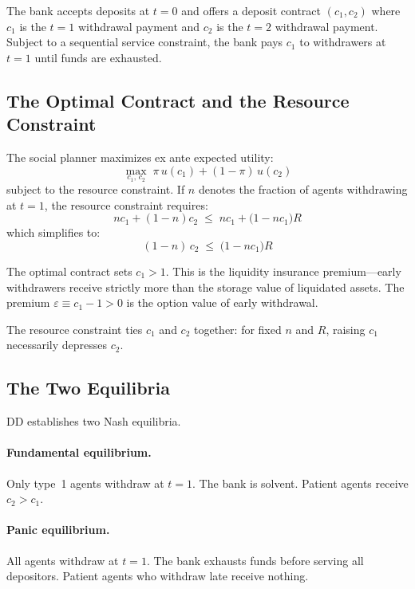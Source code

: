 \documentclass[12pt]{article}\usepackage[]{graphicx}\usepackage[]{xcolor}
\begin{document}
The bank accepts deposits at $t=0$ and offers a deposit contract $(c_1, c_2)$ where $c_1$ is the $t=1$ withdrawal payment and $c_2$ is the $t=2$ withdrawal payment.
Subject to a sequential service constraint, the bank pays $c_1$ to withdrawers at $t=1$ until funds are exhausted.

\subsection{The Optimal Contract and the Resource Constraint}

The social planner maximizes ex ante expected utility:
%
\begin{equation}
  \max_{c_1,\,c_2} \; \pi\, u(c_1) + (1-\pi)\, u(c_2)
  \label{eq:planner}
\end{equation}
%
subject to the resource constraint.
If $n$ denotes the fraction of agents withdrawing at $t=1$, the resource constraint requires:
%
\begin{equation}
  n c_1 + (1-n) c_2 \;\leq\; n c_1 + \bigl(1 - n c_1\bigr) R
  \label{eq:resource_full}
\end{equation}
%
which simplifies to:
%
\begin{equation}
  (1-n)\, c_2 \;\leq\; \bigl(1 - n c_1\bigr) R
  \label{eq:resource}
\end{equation}

The optimal contract sets $c_1 > 1$.
This is the liquidity insurance premium---early withdrawers receive strictly more than the storage value of liquidated assets.
The premium $\varepsilon \equiv c_1 - 1 > 0$ is the option value of early withdrawal.

The resource constraint ties $c_1$ and $c_2$ together: for fixed $n$ and $R$, raising $c_1$ necessarily depresses $c_2$.

\subsection{The Two Equilibria}

DD establishes two Nash equilibria.

\paragraph{Fundamental equilibrium.}
Only type~1 agents withdraw at $t=1$.
The bank is solvent.
Patient agents receive $c_2 > c_1$.

\paragraph{Panic equilibrium.}
All agents withdraw at $t=1$.
The bank exhausts funds before serving all depositors.
Patient agents who withdraw late receive nothing.
\end{document}
